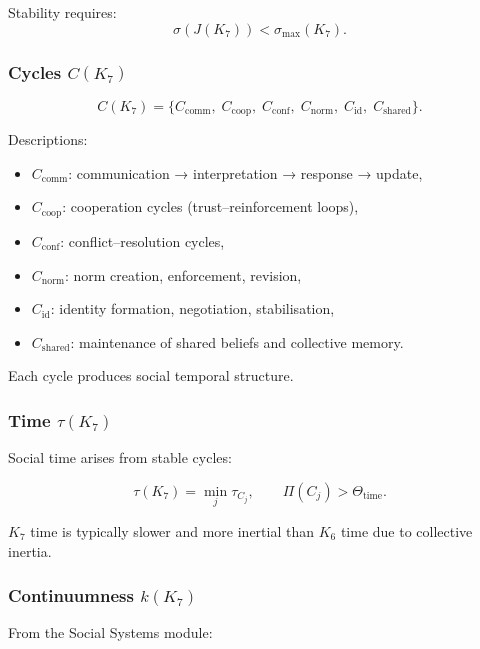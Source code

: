 Stability requires:
\[
\sigma(J(K_7)) < \sigma_{\max}(K_7).
\]

\subsubsection{Cycles \texorpdfstring{$C(K_7)$}{C(K_7)}}

\[
C(K_7)=
\{
C_{\mathrm{comm}},\;
C_{\mathrm{coop}},\;
C_{\mathrm{conf}},\;
C_{\mathrm{norm}},\;
C_{\mathrm{id}},\;
C_{\mathrm{shared}}
\}.
\]

Descriptions:
\begin{itemize}
    \item $C_{\mathrm{comm}}$: communication → interpretation → response → update,
    \item $C_{\mathrm{coop}}$: cooperation cycles (trust–reinforcement loops),
    \item $C_{\mathrm{conf}}$: conflict–resolution cycles,
    \item $C_{\mathrm{norm}}$: norm creation, enforcement, revision,
    \item $C_{\mathrm{id}}$: identity formation, negotiation, stabilisation,
    \item $C_{\mathrm{shared}}$: maintenance of shared beliefs and collective memory.
\end{itemize}

Each cycle produces social temporal structure.

\subsubsection{Time \texorpdfstring{$\tau(K_7)$}{\tau(K_7)}}

Social time arises from stable cycles:

\[
\tau(K_7)
= \min_j \tau_{C_j},
\qquad
\Pi(C_j) > \Theta_{\mathrm{time}}.
\]

$K_7$ time is typically slower and more inertial than $K_6$ time due to
collective inertia.

\subsubsection{Continuumness \texorpdfstring{$k(K_7)$}{k(K_7)}}

From the Social Systems module:


